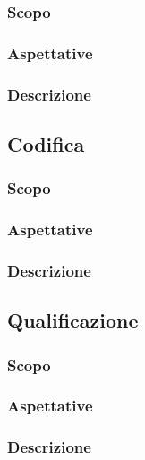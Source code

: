 \documentclass[../NormeDiProgetto.tex]{subfiles}
\begin{document}
			\subsubsection{Scopo}
			\subsubsection{Aspettative}
			\subsubsection{Descrizione}
		\subsection{Codifica}
			\subsubsection{Scopo}
			\subsubsection{Aspettative}
			\subsubsection{Descrizione}
		\subsection{Qualificazione}
			\subsubsection{Scopo}
			\subsubsection{Aspettative}
			\subsubsection{Descrizione}
\end{document}
